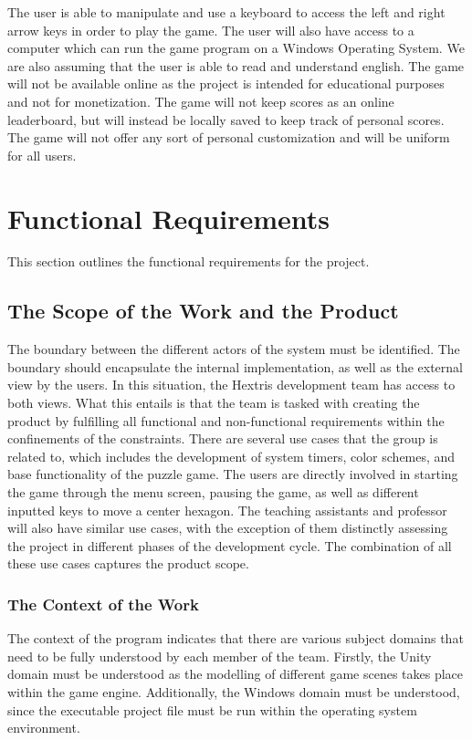 \documentclass[12pt, titlepage]{article}
\begin{document}
The user is able to manipulate and use a keyboard to access the left and right arrow keys in order to play the game. The user will also have access to a computer which can run the game program on a Windows Operating System. We are also assuming that the user is able to read and understand english. The game will not be available online as the project is intended for educational purposes and not for monetization. The game will not keep scores as an online leaderboard, but will instead be locally saved to keep track of personal scores. The game will not offer any sort of personal customization and will be uniform for all users.

\newpage
\section{Functional Requirements}
This section outlines the functional requirements for the project.

\subsection{The Scope of the Work and the Product}
The boundary between the different actors of the system must be identified. The boundary should encapsulate the internal implementation, as well as the external view by the users. In this situation, the Hextris development team has access to both views. What this entails is that the team is tasked with creating the product by fulfilling all functional and non-functional requirements within the confinements of the constraints. There are several use cases that the group is related to, which includes the development of system timers, color schemes, and base functionality of the puzzle game. The users are directly involved in starting the game through the menu screen, pausing the game, as well as different inputted keys to move a center hexagon. The teaching assistants and professor will also have similar use cases, with the exception of them distinctly assessing the project in different phases of the development cycle. The combination of all these use cases captures the product scope. 

\subsubsection{The Context of the Work}
The context of the program indicates that there are various subject domains that need to be fully understood by each member of the team. Firstly, the Unity domain must be understood as the modelling of different game scenes takes place within the game engine. Additionally, the Windows domain must be understood, since the executable project file must be run within the operating system environment.
\end{document}
